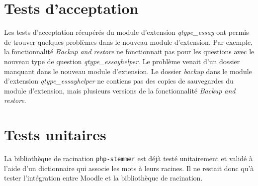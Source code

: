 \section{Tests d'acceptation}
Les tests d'acceptation r\'ecup\'er\'es du module d'extension \textit{qtype\_essay} ont permis de trouver quelques probl\`emes  dans le nouveau module d'extension.
Par exemple, la fonctionnalit\'e \textit{Backup and restore} ne fonctionnait pas pour les questions avec le nouveau type de question \textit{qtype\_essayhelper}.
Le probl\`eme venait d'un dossier manquant dans le nouveau module d'extension.
Le dossier \textit{backup} dans le module d'extension \textit{qtype\_essayhelper} ne contiens pas des copies de sauvegardes du module d'extension, mais plusieurs versions de la fonctionnalit\'e \textit{Backup and restore}.
\section{Tests unitaires}
La biblioth\`eque de racination \texttt{php-stemmer} est d\'ej\`a test\'e unitairement et valid\'e \`a l'aide d'un dictionnaire qui associe les mots \`a leurs racines.
Il ne restait donc qu'\`a tester l'int\'egration entre Moodle et la biblioth\`eque de racination.